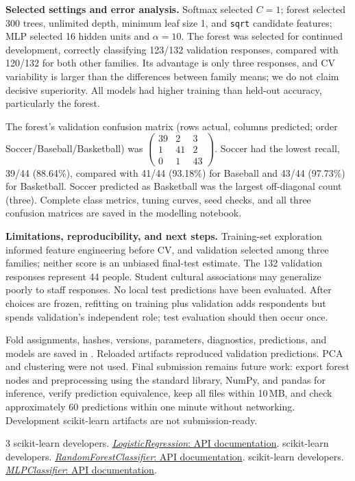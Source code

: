 \documentclass[10pt,letterpaper]{article}
\newcommand{\topic}[1]{\par\smallskip\textbf{#1}\quad}
\begin{document}
\topic{Selected settings and error analysis.}
Softmax selected $C=1$; forest selected 300 trees, unlimited depth, minimum leaf
size 1, and \texttt{sqrt} candidate features; MLP selected 16 hidden units and
$\alpha=10$. The forest was selected for continued development, correctly
classifying 123/132 validation responses, compared with 120/132 for both other
families. Its advantage is only three responses, and CV variability is larger
than the differences between family means; we do not claim decisive superiority.
All models had higher training than held-out accuracy, particularly the forest.

The forest's validation confusion matrix (rows actual, columns predicted; order
Soccer/Baseball/Basketball) was
$\left(\begin{smallmatrix}39&2&3\\1&41&2\\0&1&43\end{smallmatrix}\right)$.
Soccer had the lowest recall, 39/44 (88.64\%), compared with 41/44 (93.18\%)
for Baseball and 43/44 (97.73\%) for Basketball. Soccer predicted as Basketball
was the largest off-diagonal count (three). Complete class metrics, tuning curves,
seed checks, and all three confusion matrices are saved in the modelling notebook.

\topic{Limitations, reproducibility, and next steps.}
Training-set exploration informed feature engineering before CV, and validation
selected among three families; neither score is an unbiased final-test estimate.
The 132 validation responses represent 44 people. Student cultural associations
may generalize poorly to staff responses. No local test predictions have been evaluated.
After choices are frozen, refitting on training plus validation adds respondents
but spends validation's independent role; test evaluation should then occur once.

Fold assignments, hashes, versions, parameters, diagnostics, predictions, and
models are saved in . Reloaded artifacts reproduced
validation predictions. PCA and clustering were not used. Final submission remains
future work: export forest nodes and preprocessing using the standard library, NumPy, and pandas for
inference, verify prediction equivalence, keep all files within 10\,MB, and check
approximately 60 predictions within one minute without networking. Development
scikit-learn artifacts are not submission-ready.

\begingroup
\small
\begin{thebibliography}{3}
\setlength{\itemsep}{0pt}
 scikit-learn developers.
\href{https://scikit-learn.org/stable/modules/generated/sklearn.linear_model.LogisticRegression.html}{\textit{LogisticRegression}: API documentation}.
 scikit-learn developers.
\href{https://scikit-learn.org/stable/modules/generated/sklearn.ensemble.RandomForestClassifier.html}{\textit{RandomForestClassifier}: API documentation}.
 scikit-learn developers.
\href{https://scikit-learn.org/stable/modules/generated/sklearn.neural_network.MLPClassifier.html}{\textit{MLPClassifier}: API documentation}.
\end{thebibliography}
\endgroup
\end{document}
